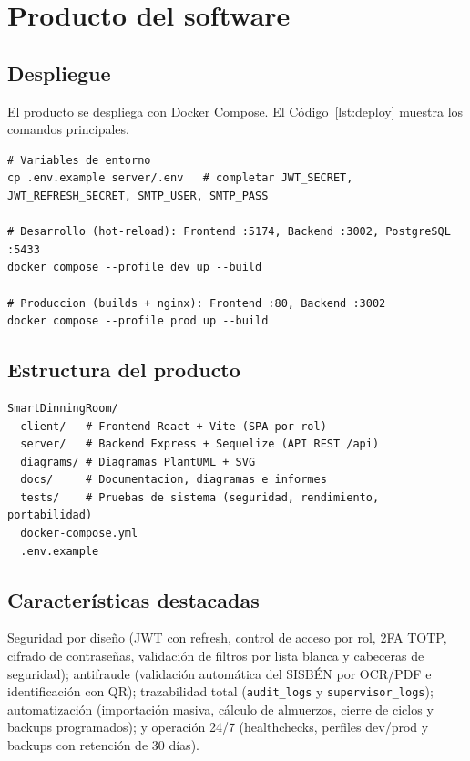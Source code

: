 \documentclass[stu,11pt,floatsintext]{apa7}
\begin{document}
\section{Producto del software}

\subsection{Despliegue}
El producto se despliega con Docker Compose. El Código~\ref{lst:deploy} muestra los
comandos principales.

\begin{lstlisting}[caption={Despliegue del producto},label={lst:deploy},captionpos=b]
# Variables de entorno
cp .env.example server/.env   # completar JWT_SECRET, JWT_REFRESH_SECRET, SMTP_USER, SMTP_PASS

# Desarrollo (hot-reload): Frontend :5174, Backend :3002, PostgreSQL :5433
docker compose --profile dev up --build

# Produccion (builds + nginx): Frontend :80, Backend :3002
docker compose --profile prod up --build
\end{lstlisting}

\subsection{Estructura del producto}
\begin{lstlisting}[caption={Estructura del proyecto},captionpos=b]
SmartDinningRoom/
  client/   # Frontend React + Vite (SPA por rol)
  server/   # Backend Express + Sequelize (API REST /api)
  diagrams/ # Diagramas PlantUML + SVG
  docs/     # Documentacion, diagramas e informes
  tests/    # Pruebas de sistema (seguridad, rendimiento, portabilidad)
  docker-compose.yml
  .env.example
\end{lstlisting}

\subsection{Características destacadas}
Seguridad por diseño (JWT con refresh, control de acceso por rol, 2FA TOTP, cifrado de
contraseñas, validación de filtros por lista blanca y cabeceras de seguridad);
antifraude (validación automática del SISBÉN por OCR/PDF e identificación con QR);
trazabilidad total (\texttt{audit\_logs} y \texttt{supervisor\_logs}); automatización
(importación masiva, cálculo de almuerzos, cierre de ciclos y backups programados); y
operación 24/7 (healthchecks, perfiles dev/prod y backups con retención de 30 días).
\end{document}
